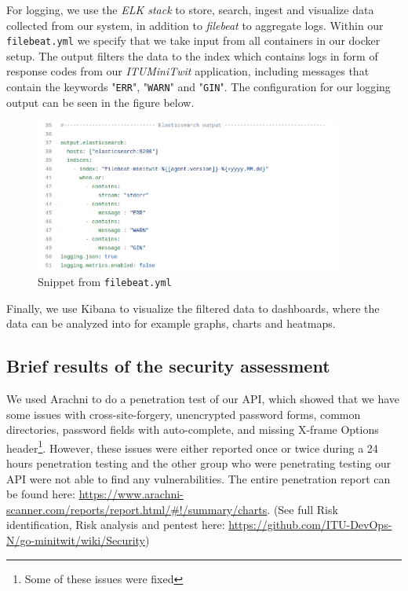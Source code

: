 For logging, we use the \textit{ELK stack} to store, search, ingest and visualize data collected from our system, in addition to \textit{filebeat} to aggregate logs. Within our \texttt{filebeat.yml} we specify that we take input from all containers in our docker setup. The output filters the data to the index which contains logs in form of response codes from our \textit{ITUMiniTwit} application, including messages that contain the keywords "\texttt{ERR}", "\texttt{WARN}" and "\texttt{GIN}". The configuration for our logging output can be seen in the figure below.
\begin{figure}[ht]
    \centering
    \includegraphics[width=0.9\textwidth]{images/filebeat-snippet.png}
    \caption{Snippet from \texttt{filebeat.yml}}
    \label{fig:filebeat}
\end{figure}

Finally, we use Kibana to visualize the filtered data to dashboards, where the data can be analyzed into for example graphs, charts and heatmaps.

\subsection{Brief results of the security assessment}
We used Arachni to  do a penetration test of our API, which showed that we have some issues with cross-site-forgery, unencrypted password forms, common directories, password fields with auto-complete, and missing X-frame Options header\footnote{Some of these issues were fixed}. However, these issues were either reported once or twice during a 24 hours penetration testing and the other group who were penetrating testing our API were not able to find any vulnerabilities. The entire penetration report can be found here: \url{https://www.arachni-scanner.com/reports/report.html/#!/summary/charts}. (See full Risk identification, Risk analysis and pentest here: \url{https://github.com/ITU-DevOps-N/go-minitwit/wiki/Security}) 


